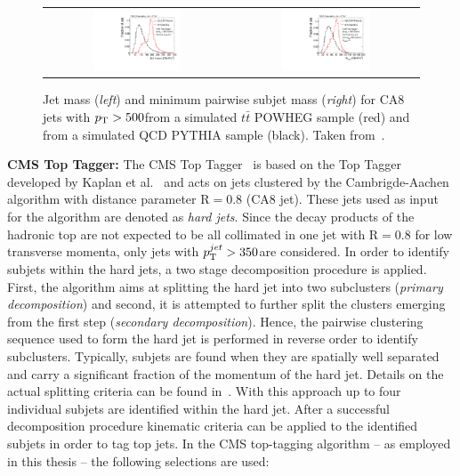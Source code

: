 \begin{description}
\begin{figure}[!tp]
  \centering 
  \begin{tabular}{cc}
    \includegraphics[width=0.49\textwidth]{figures/Draw2HistogramsFrom1File_QQ_MASS_CUT_PT_TT_MASS_CUT_PT_JetPt500.pdf} & 
    \includegraphics[width=0.49\textwidth]{figures/Draw2HistogramsFrom1File_QQ_MINM_CUT_PT_MASS_NSUB_TT_MINM_CUT_PT_MASS_NSUB_JetPt500.pdf}
  \end{tabular}
  \caption{Jet mass (\textit{left}) and minimum pairwise subjet mass (\textit{right}) for CA8 jets with $p_{\text{T}} > 500$\gev from a simulated $t\bar{t}$ POWHEG sample (red) and from a simulated QCD PYTHIA sample (black). Taken from~\cite{CMS:2014fya}.}
  \label{fig:boosted_top_cms_variables}
\end{figure}
 \item \textbf{CMS Top Tagger:} The CMS Top Tagger~\cite{CMS-PAS-JME-09-001} is based on the Top Tagger developed by Kaplan et al.~\cite{Kaplan:2008ie} and acts on jets clustered by the Cambrigde-Aachen algorithm with distance parameter $\mathrm{R} = 0.8$ (CA8 jet). These jets used as input for the algorithm are denoted as \textit{hard jets}. Since the decay products of the hadronic top are not expected to be all collimated in one jet with $\mathrm{R} = 0.8$ for low transverse momenta, only jets with $p_{\text{T}}^{jet} > 350$\gev are considered. In order to identify subjets within the hard jets, a two stage decomposition procedure is applied. First, the algorithm aims at splitting the hard jet into two subclusters (\textit{primary decomposition}) and second, it is attempted to further split the clusters emerging from the first step (\textit{secondary decomposition}). Hence, the pairwise clustering sequence used to form the hard jet is performed in reverse order to identify subclusters. Typically, subjets are found when they are spatially well separated and carry a significant fraction of the momentum of the hard jet. Details on the actual splitting criteria can be found in~\cite{CMS:2014fya}. With this approach up to four individual subjets are identified within the hard jet. After a successful decomposition procedure kinematic criteria can be applied to the identified subjets in order to tag top jets. In the CMS top-tagging algorithm -- as employed in this thesis -- the following selections are used:

\end{description}
